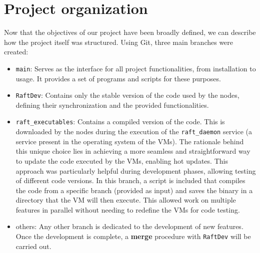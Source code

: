 \section{Project organization}
Now that the objectives of our project have been broadly defined, we can 
describe how the project itself was structured.
Using Git, three main branches were created:
\begin{itemize}
  \item \texttt{main}: Serves as the interface for all project functionalities, 
    from installation to usage. It provides a set of programs and scripts for these purposes.

  \item \texttt{RaftDev}: Contains only the stable version of the code used by the
    nodes, defining their synchronization and the provided functionalities.

  \item \texttt{raft\_executables}: Contains a compiled version of the code. This is 
    downloaded by the nodes during the execution of the \texttt{raft\_daemon} service 
    (a service present in the operating system of the VMs).
    The rationale behind this unique choice lies in achieving a more seamless 
    and straightforward way to update the code executed by the VMs, enabling 
    hot updates.
    This approach was particularly helpful during development phases, allowing 
    testing of different code versions. In this branch, a script is included 
    that compiles the code from a specific branch (provided as input) and saves
    the binary in a directory that the VM will then execute.
    This allowed work on multiple features in parallel without needing to 
    redefine the VMs for code testing.

  \item others: Any other branch is dedicated to the development of new features. 
    Once the development is complete, a \textbf{merge} procedure with 
    \texttt{RaftDev} will be carried out.
\end{itemize}
